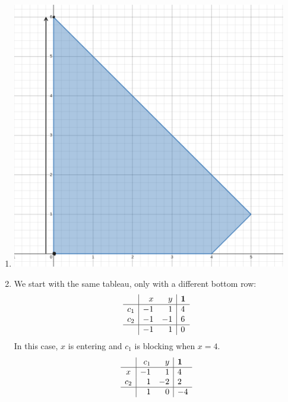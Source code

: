 \documentclass[12pt]{article}
\begin{document}
\begin{enumerate}
\begin{enumerate}
                  \item \includegraphics[width=12cm]{img/hw5/simplex_path}
                  \item We start with the same tableau, only with a different bottom row:
                        \[\begin{array}{c|rr|l}
                                        & x  & y  & \mathbf{1} \\ \hline
                                    c_1 & -1 & 1  & 4          \\
                                    c_2 & -1 & -1 & 6          \\ \hline
                                        & -1 & 1  & 0          \\
                              \end{array}\]
                        In this case, $x$ is entering and $c_1$ is blocking when $x=4$.
                        \[\begin{array}{c|rr|l}
                                        & c_1 & y  & \mathbf{1} \\ \hline
                                    x   & -1  & 1  & 4          \\
                                    c_2 & 1   & -2 & 2          \\ \hline
                                        & 1   & 0  & -4         \\
                              \end{array}\]

\end{enumerate}
\end{enumerate}
\end{document}

